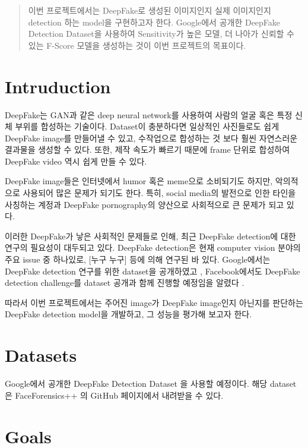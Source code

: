 \documentclass{article}
\begin{document}
\begin{abstract}
이번 프로젝트에서는 DeepFake로 생성된 이미지인지 실제 이미지인지 detection 하는 model을 구현하고자 한다. Google에서 공개한 DeepFake Detection Dataset을 사용하여 Sensitivity가 높은 모델, 더 나아가 신뢰할 수 있는 F-Score 모델을 생성하는 것이 이번 프로젝트의 목표이다.
\end{abstract}

\section{Intruduction}

DeepFake는 GAN과 같은 deep neural network를 사용하여 사람의 얼굴 혹은 특정 신체 부위를 합성하는 기술이다. Dataset이 충분하다면 일상적인 사진들로도 쉽게 DeepFake image를 만들어낼 수 있고, 수작업으로 합성하는 것 보다 훨씬 자연스러운 결과물을 생성할 수 있다. 또한, 제작 속도가 빠르기 때문에 frame 단위로 합성하여 DeepFake video 역시 쉽게 만들 수 있다.

DeepFake image들은 인터넷에서 humor 혹은 meme으로 소비되기도 하지만, 악의적으로 사용되어 많은 문제가 되기도 한다. 특히, social media의 발전으로 인한 타인을 사칭하는 계정과 DeepFake pornography의 양산으로 사회적으로 큰 문제가 되고 있다.

이러한 DeepFake가 낳은 사회적인 문제들로 인해, 최근 DeepFake detection에 대한 연구의 필요성이 대두되고 있다. DeepFake detection은 현재 computer vision 분야의 주요 issue 중 하나있로, [누구 누구] 등에 의해 연구된 바 있다. Google에서는 DeepFake detection 연구를 위한 dataset을 공개하였고 \cite{googleblog}, Facebook에서도 DeepFake detection challenge를 dataset 공개과 함께 진행할 예정임을 알렸다 \cite{facebookblog}.

따라서 이번 프로젝트에서는 주어진 image가 DeepFake image인지 아닌지를 판단하는 DeepFake detection model을 개발하고, 그 성능을 평가해 보고자 한다.

\section{Datasets}

Google에서 공개한 DeepFake Detection Dataset \cite{DDD_GoogleJigSaw2019} 을 사용할 예정이다. 해당 dataset은 FaceForensics++ \cite{roessler2019faceforensicspp}의 GitHub 
페이지에서 내려받을 수 있다.

\section{Goals}
\end{document}
